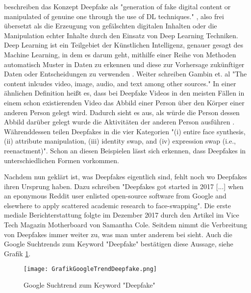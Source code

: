 \textcite{gambinDeepfakesCurrentFuture2024} beschreiben das Konzept Deepfake als "generation of fake digital content or manipulated of genuine one through the use of DL techniques." \cite[S. ?]{gambinDeepfakesCurrentFuture2024},
also frei übersetzt als die Erzeugung von gefälschten digitalen Inhalten oder die Manipulation echter Inhalte durch den Einsatz von Deep Learning Techniken. 
Deep Learning ist ein Teilgebiet der Künstlichen Intelligenz, genauer gesagt des Machine Learning, in dem es darum geht, mithilfe einer Reihe von Methoden automatisch Muster in Daten zu erkennen und diese zur Vorhersage zukünftiger Daten oder Entscheidungen zu verwenden \autocite[S. 1]{murphyMachineLearningProbabilistic2012} . 
Weiter schreiben Gambin et. al "The content inlcudes video, image, audio, and text among other sources." 
In einer ähnlichen Definition heißt es, dass bei Deepfake Videos in den meisten Fällen in einem schon existierenden Video das Abbild einer Person über den Körper einer anderen Person gelegt wird. 
Dadurch sieht es aus, als würde die Person dessen Abbild darüber gelegt wurde die Aktivitäten der anderen Person ausführen \autocite{harrisVideoDemandWhat2021}.
Währenddessen teilen \textcite{juefei-xuCounteringMaliciousDeepFakes2022} Deepfakes in die vier Kategorien "(i) entire face synthesis, (ii) attribute manipulation, (iii) identity swap, and (iv) expression swap (i.e., reenactment)". 
Schon an diesen Beispielen lässt sich erkennen, dass Deepfakes in unterschiedlichen Formen vorkommen.

Nachdem nun geklärt ist, was Deepfakes eigentlich sind, fehlt noch wo Deepfakes ihren Ursprung \cite{AIAssistedFakePorn2017} haben. 
Dazu schreiben \textcite{kernerPornDiscreditationEpistemic2021} "Deepfakes got started in 2017 [...] when an eponymous Reddit user enlisted open-source software from Google and elsewhere to apply scattered academic research to face-swapping". 
Die erste mediale Berichterstattung folgte im Dezember 2017 durch den Artikel \textcite{AIAssistedFakePorn2017} im Vice Tech Magazin Motherboard von Samantha Cole.
Seitdem nimmt die Verbreitung von Deepfakes immer weiter zu, was man unter anderem bei \textcite{ranaDeepfakeDetectionSystematic2022,westerlundEmergenceDeepfakeTechnology2019,gamagePDFEmergenceDeepfakes} sieht. 
Auch die Google Suchtrends zum Keyword "Deepfake" bestätigen diese Aussage, siehe Grafik \ref{fig:suchtrend-grafik}.
\begin{figure} [htbp]
    \centering
    \texttt{[image: GrafikGoogleTrendDeepfake.png]}
    \caption{Google Suchtrend zum Keyword "Deepfake"}
    \label{fig:suchtrend-grafik}
\end{figure}

